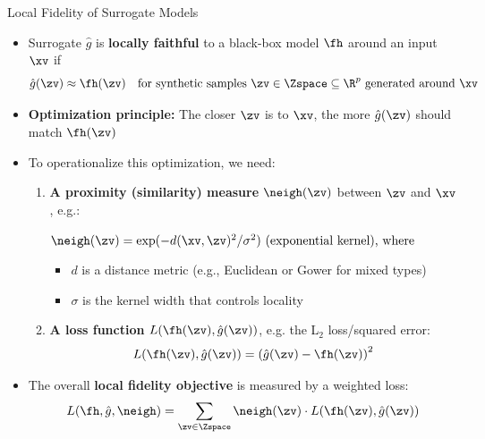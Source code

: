 \documentclass[11pt,compress,t,notes=noshow, aspectratio=169, xcolor=table]{beamer}
\newcommand{\gh}{\hat{g}}
\begin{document}
\begin{frame}{Local Fidelity of Surrogate Models}

  \begin{itemize}
    \item Surrogate \( \gh \) is \textbf{locally faithful} to a black-box model \( \fh \) around an input \( \xv \) if
    \[
    \gh(\zv) \approx \fh(\zv) \quad \text{for synthetic samples } \zv \in \Zspace \subseteq \R^p \text{ generated around } \xv
    \]

    \pause

    \item \textbf{Optimization principle:} The closer \( \zv \) is to \( \xv \), the more \( \gh(\zv) \) should match \( \fh(\zv) \)

    \pause

    \item To operationalize this optimization, we need:
    \begin{enumerate}
      \item \textbf{A proximity (similarity) measure} $\neigh(\zv)$ between $\zv$ and $\xv$, e.g.:
      
        \medskip
        \centerline{$
        \neigh(\zv) = \exp(-d(\xv, \zv)^2 / \sigma^2)  \text{ (exponential kernel), where}
        $}
        \medskip
        
        \begin{itemize}
            \item \( d \) is a distance metric (e.g., Euclidean or Gower for mixed types)
            \item \( \sigma \) is the kernel width that controls locality
        \end{itemize}
        
        

      \pause
      \item \textbf{A loss function} \( L(\fh(\zv), \gh(\zv)) \), e.g. the L$_2$ loss/squared error:
        \[
        L(\fh(\zv), \gh(\zv)) = \left( \gh(\zv) - \fh(\zv) \right)^2
        \]
    \end{enumerate}

    \pause

    \item The overall \textbf{local fidelity objective} is measured by a weighted loss:
    \[
    L(\fh, \gh, \neigh) = \sum_{\zv \in \Zspace} \neigh(\zv) \cdot L(\fh(\zv), \gh(\zv))
    \]
  \end{itemize}
\end{frame}
\end{document}

